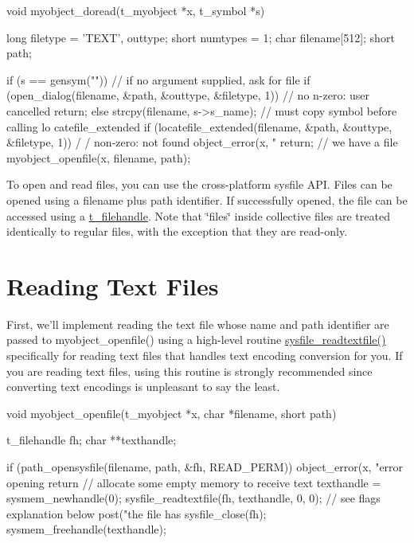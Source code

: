 \begin{DoxyCode}
    void myobject_doread(t_myobject *x, t_symbol *s)
    {
        long filetype = 'TEXT', outtype;
        short numtypes = 1;
        char filename[512];
        short path;

        if (s == gensym("")) {      // if no argument supplied, ask for file
            if (open_dialog(filename, &path, &outtype, &filetype, 1))       // no
      n-zero: user cancelled
                return;
        } else {
            strcpy(filename, s->s_name);    // must copy symbol before calling lo
      catefile_extended
            if (locatefile_extended(filename, &path, &outtype, &filetype, 1)) { /
      / non-zero: not found
                object_error(x, "%
                return;
            }
        }
        // we have a file
        myobject_openfile(x, filename, path);
    }
\end{DoxyCode}


To open and read files, you can use the cross-\/platform sysfile API. Files can be opened using a filename plus path identifier. If successfully opened, the file can be accessed using a \hyperlink{group__files_gafcb776aa74d514754e83b30995b5a5d1}{t\_\-filehandle}. Note that \char`\"{}files\char`\"{} inside collective files are treated identically to regular files, with the exception that they are read-\/only.\hypertarget{chapter_files_chapter_files_reading_text_files}{}\section{Reading Text Files}\label{chapter_files_chapter_files_reading_text_files}
First, we'll implement reading the text file whose name and path identifier are passed to myobject\_\-openfile() using a high-\/level routine \hyperlink{group__files_gabb35e28302ee972648e61f9a5a61b96a}{sysfile\_\-readtextfile()} specifically for reading text files that handles text encoding conversion for you. If you are reading text files, using this routine is strongly recommended since converting text encodings is unpleasant to say the least.


\begin{DoxyCode}
    void myobject_openfile(t_myobject *x, char *filename, short path)
    {
        t_filehandle fh;
        char **texthandle;

        if (path_opensysfile(filename, path, &fh, READ_PERM)) {
            object_error(x, "error opening %
            return
        }
        // allocate some empty memory to receive text
        texthandle = sysmem_newhandle(0);
        sysfile_readtextfile(fh, texthandle, 0, 0);     // see flags explanation 
      below
        post("the file has %
        sysfile_close(fh);
        sysmem_freehandle(texthandle);
    }
\end{DoxyCode}


